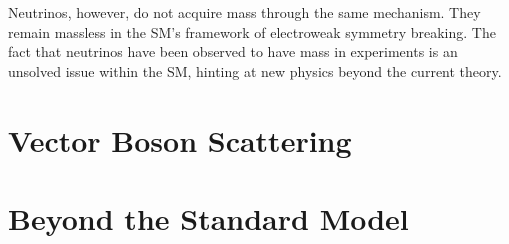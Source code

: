 Neutrinos, however, do not acquire mass through the same mechanism. They remain massless in the SM's framework of electroweak symmetry breaking. The fact that neutrinos have been observed to have mass in experiments is an unsolved issue within the SM, hinting at new physics beyond the current theory.

\section{Vector Boson Scattering}


\clearpage
\section{Beyond the Standard Model}

